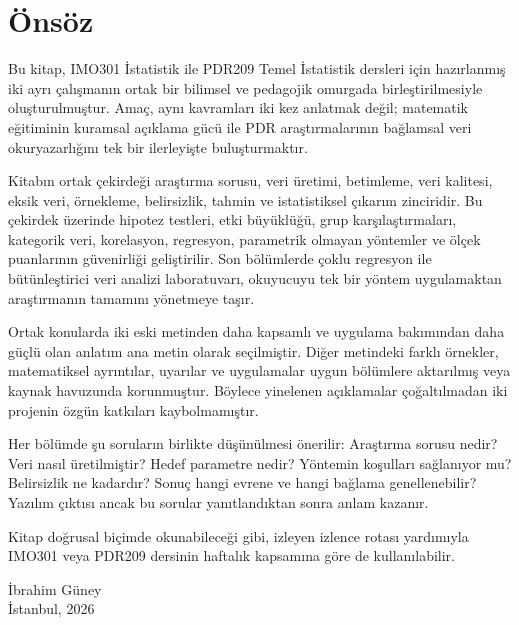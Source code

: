 \chapter*{Önsöz}

Bu kitap, IMO301 İstatistik ile PDR209 Temel İstatistik dersleri için
hazırlanmış iki ayrı çalışmanın ortak bir bilimsel ve pedagojik omurgada
birleştirilmesiyle oluşturulmuştur. Amaç, aynı kavramları iki kez anlatmak
değil; matematik eğitiminin kuramsal açıklama gücü ile PDR araştırmalarının
bağlamsal veri okuryazarlığını tek bir ilerleyişte buluşturmaktır.

Kitabın ortak çekirdeği araştırma sorusu, veri üretimi, betimleme, veri
kalitesi, eksik veri, örnekleme, belirsizlik, tahmin ve istatistiksel çıkarım
zinciridir. Bu çekirdek üzerinde
hipotez testleri, etki büyüklüğü, grup karşılaştırmaları, kategorik veri,
korelasyon, regresyon, parametrik olmayan yöntemler ve ölçek puanlarının
güvenirliği geliştirilir. Son bölümlerde çoklu regresyon ile bütünleştirici veri analizi laboratuvarı,
okuyucuyu tek bir yöntem uygulamaktan araştırmanın tamamını yönetmeye taşır.

Ortak konularda iki eski metinden daha kapsamlı ve uygulama bakımından daha
güçlü olan anlatım ana metin olarak seçilmiştir. Diğer metindeki farklı
örnekler, matematiksel ayrıntılar, uyarılar ve uygulamalar uygun bölümlere
aktarılmış veya kaynak havuzunda korunmuştur. Böylece yinelenen açıklamalar
çoğaltılmadan iki projenin özgün katkıları kaybolmamıştır.

Her bölümde şu soruların birlikte düşünülmesi önerilir: Araştırma sorusu
nedir? Veri nasıl üretilmiştir? Hedef parametre nedir? Yöntemin koşulları
sağlanıyor mu? Belirsizlik ne kadardır? Sonuç hangi evrene ve hangi bağlama
genellenebilir? Yazılım çıktısı ancak bu sorular yanıtlandıktan sonra anlam
kazanır.

Kitap doğrusal biçimde okunabileceği gibi, izleyen izlence rotası yardımıyla
IMO301 veya PDR209 dersinin haftalık kapsamına göre de kullanılabilir.

\begin{flushright}
İbrahim Güney\\
İstanbul, 2026
\end{flushright}